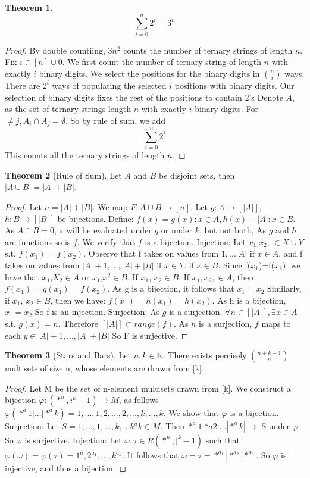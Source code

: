 \documentclass{article}
\theoremstyle{definition}
\newtheorem{thm}{Theorem}[section]
\begin{document}
\begin{thm}
$$\sum_{i=0}^{n} 2^{i} = 3^n$$
\end{thm}
\begin{proof}
By double countiing, $3n^2$ counts the number of ternary strings of length $n$. Fix $i \in[n]\cup{0}$. We first count the number of ternary string of length $n$ with exactly $i$ binary digits. We select the positions for the binary digits in ${n}\choose{i}$ ways. There are $2^i$ ways of populating the selected $i$ positions with binary digits. Our selection of binary digits fixes the rest of the positions to contain $2$'s Denote $A$, as the set of ternary strings length $n$ with exactly $i$ binary digits. For $ \neq j, A_i \cap A_j = \emptyset$. So by rule of sum, we add $$\sum_{i=0}^{n} 2^{i}$$ This counts all the ternary strings of length $n$.
\end{proof}

\begin{thm}[Rule of Sum]
Let $A$ and $B$ be disjoint sets, then $|A \cup B|=|A|+|B|$.
\end{thm}
\begin{proof}
Let $n=|A|+|B|$. We map $F: A \cup B \rightarrow [n]$. Let $g: A \rightarrow [|A|]$, $h:B \rightarrow [|B|]$ be bijections. Define: $f(x)={g(x): x \in A, h(x)+|A|:x\in B}$. As $A \cap B=0$, x will be evaluated under $g$ or under $k$, but not both, As $g$ and $h$ are functions so is $f$. We verify that $f$ is a bijection. Injection: Let $x_1$,$x_2$, $\in X\cup Y$ s.t. $f(x_1)=f(x_2)$. Observe that f takes on values from ${1,...|A|}$ if $x \in A$, and f takes on values from ${|A|+1,...,|A|+|B|}$ if $x \in Y$. if $x \in B$. Since f($x_1$)=f($x_2$), we have that $x_1$,$X_2 \in A$ or $x_1$,$x^2 \in B$. If $x_1$, $x_2 \in B$. If $x_1, x_2, \in A$, then $f(x_1)=g(x_1)=f(x_2)$. As g is a bijection, it follows that $x_1=x_2$ Similarly, if $x_1$, $x_2 \in B$, then we have: $f(x_1)=h(x_1)=h(x_2)$. As h is a bijection, $x_1= x_2$ So f is an injection. Surjection: As $g$ is a surjection, $\forall n \in [|A|], \exists x \in A$ s.t. $g(x)=n$. Therefore $[|A|]\subset range(f)$. As $h$ is a surjection, $f$ maps to each $y \in {|A|+1,...,|A|+|B|}$ So F is surjective.
\end{proof}

\begin{thm}[Stars and Bars]
Let $n,k\in \mathbb{N}$. There exists percisely ${n+k-1 \choose n}$ multisets of size n, whose elements are drawn from [k].
\end{thm}
\begin{proof}
Let M be the set of n-element multisets drawn from [k]. We construct a bijection $\varphi:(*^n,i^k-1) \rightarrow M$, as follows $\varphi (*^a1|...|*^ak) = {1,...,1,2,...,2,...,k,...,k}$. We show that $\varphi$ is a bijection. 
Surjection: Let $S = {1,...,1,...,k,...k^ak} \in M$. Then $*^a1|*a2|...|*^ak| \rightarrow$ S under $\varphi$ So $\varphi$ is surjective. Injection: Let $\omega, \tau \in R(*^n,|^k-1)$ such that $\varphi(\omega) =  \varphi(\tau)= {1^a,2^{a_{1}},...,k^{a_{k}}}$. It follows that $\omega = \tau = *^{a_{1}}|*^{a_{2}}|*^{a_{3}}$. So $\varphi$ is injective, and thus a bijection.
\end{proof}
\end{document}
